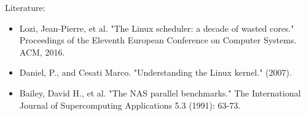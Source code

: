 Literature:
\begin{itemize}
\item Lozi, Jean-Pierre, et al. "The Linux scheduler: a decade of wasted cores." Proceedings of the Eleventh European Conference on Computer Systems. ACM, 2016.
\item Daniel, P., and Cesati Marco. "Understanding the Linux kernel." (2007).
\item Bailey, David H., et al. "The NAS parallel benchmarks." The International Journal of Supercomputing Applications 5.3 (1991): 63-73.
\end{itemize}
